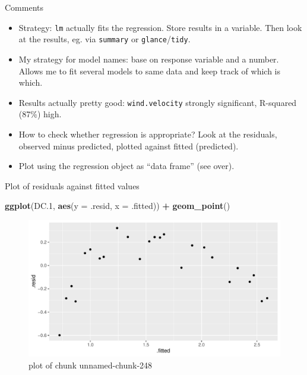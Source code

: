 \documentclass[ignorenonframetext,]{beamer}
\newenvironment{Shaded}{\begin{snugshade}}{\end{snugshade}}
\newcommand{\DataTypeTok}[1]{\textcolor[rgb]{0.13,0.29,0.53}{#1}}
\newcommand{\FloatTok}[1]{\textcolor[rgb]{0.00,0.00,0.81}{#1}}
\newcommand{\KeywordTok}[1]{\textcolor[rgb]{0.13,0.29,0.53}{\textbf{#1}}}
\newcommand{\NormalTok}[1]{#1}
\newcommand{\OperatorTok}[1]{\textcolor[rgb]{0.81,0.36,0.00}{\textbf{#1}}}
\newcommand{\StringTok}[1]{\textcolor[rgb]{0.31,0.60,0.02}{#1}}
\providecommand{\tightlist}{%
  \setlength{\itemsep}{0pt}\setlength{\parskip}{0pt}}
\begin{document}
\begin{frame}[fragile]{Comments}
\protect\hypertarget{comments-14}{}

\begin{itemize}
\tightlist
\item
  Strategy: \texttt{lm} actually fits the regression. Store results in a
  variable. Then look at the results, eg. via \texttt{summary} or
  \texttt{glance}/\texttt{tidy}.
\item
  My strategy for model names: base on response variable and a number.
  Allows me to fit several models to same data and keep track of which
  is which.
\item
  Results actually pretty good: \texttt{wind.velocity} strongly
  significant, R-squared (87\%) high.
\item
  How to check whether regression is appropriate? Look at the residuals,
  observed minus predicted, plotted against fitted (predicted).
\item
  Plot using the regression object as ``data frame'' (see over).
\end{itemize}

\end{frame}

\begin{frame}[fragile]{Plot of residuals against fitted values}
\protect\hypertarget{plot-of-residuals-against-fitted-values}{}

\begin{Shaded}
\begin{Highlighting}[]
\KeywordTok{ggplot}\NormalTok{(DC}\FloatTok{.1}\NormalTok{, }\KeywordTok{aes}\NormalTok{(}\DataTypeTok{y =}\NormalTok{ .resid, }\DataTypeTok{x =}\NormalTok{ .fitted)) }\OperatorTok{+}\StringTok{ }\KeywordTok{geom_point}\NormalTok{()}
\end{Highlighting}
\end{Shaded}

\begin{figure}
\centering
\includegraphics{figure/unnamed-chunk-248-1.pdf}
\caption{plot of chunk unnamed-chunk-248}
\end{figure}

\end{frame}
\end{document}
